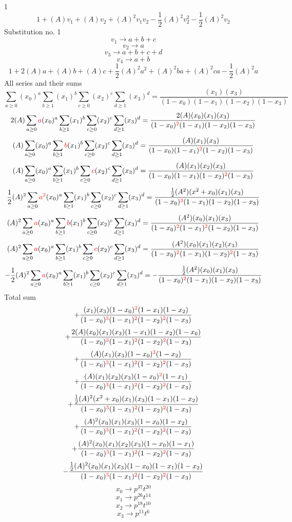 \documentclass{article}
\begin{document}
                
1
\[1+(A)v_1+(A)v_2+(A)^2v_1v_2-\frac{1}{2}(A)^2v_2^{2}-\frac{1}{2}(A)^2v_2\]Substitution no. 1\[v_1\rightarrow{a+b+c}\]\[v_2\rightarrow{a}\]\[v_3\rightarrow{a+b+c+d}\]\[v_4\rightarrow{a+b}\]\[1+2(A)a+(A)b+(A)c+\frac{1}{2}(A)^2a^{2}+(A)^2ba+(A)^2ca-\frac{1}{2}(A)^2a\]All series and their sums\[\sum_{a\geq{0}}(x_0)^{a}\sum_{b\geq{1}}(x_1)^{b}\sum_{c\geq{0}}(x_2)^{c}\sum_{d\geq{1}}(x_3)^{d}=\frac{(x_1)(x_3)}{(1-x_0)(1-x_1)(1-x_2)(1-x_3)}\]\[2(A)\sum_{a\geq{0}}\textcolor{red}{a}(x_0)^{a}\sum_{b\geq{1}}(x_1)^{b}\sum_{c\geq{0}}(x_2)^{c}\sum_{d\geq{1}}(x_3)^{d}=\frac{2(A)(x_0)(x_1)(x_3)}{(1-x_0)^{\textcolor{red}{2}}(1-x_1)(1-x_2)(1-x_3)}\]\[(A)\sum_{a\geq{0}}(x_0)^{a}\sum_{b\geq{1}}\textcolor{red}{b}(x_1)^{b}\sum_{c\geq{0}}(x_2)^{c}\sum_{d\geq{1}}(x_3)^{d}=\frac{(A)(x_1)(x_3)}{(1-x_0)(1-x_1)^{\textcolor{red}{2}}(1-x_2)(1-x_3)}\]\[(A)\sum_{a\geq{0}}(x_0)^{a}\sum_{b\geq{1}}(x_1)^{b}\sum_{c\geq{0}}\textcolor{red}{c}(x_2)^{c}\sum_{d\geq{1}}(x_3)^{d}=\frac{(A)(x_1)(x_2)(x_3)}{(1-x_0)(1-x_1)(1-x_2)^{\textcolor{red}{2}}(1-x_3)}\]\[\frac{1}{2}(A)^{2}\sum_{a\geq{0}}\textcolor{red}{a^{2}}(x_0)^{a}\sum_{b\geq{1}}(x_1)^{b}\sum_{c\geq{0}}(x_2)^{c}\sum_{d\geq{1}}(x_3)^{d}=\frac{\frac{1}{2}(A^{2})(x^{2}+x_0)(x_1)(x_3)}{(1-x_0)^{\textcolor{red}{3}}(1-x_1)(1-x_2)(1-x_3)}\]\[(A)^{2}\sum_{a\geq{0}}\textcolor{red}{a}(x_0)^{a}\sum_{b\geq{1}}\textcolor{red}{b}(x_1)^{b}\sum_{c\geq{0}}(x_2)^{c}\sum_{d\geq{1}}(x_3)^{d}=\frac{(A^{2})(x_0)(x_1)(x_3)}{(1-x_0)^{\textcolor{red}{2}}(1-x_1)^{\textcolor{red}{2}}(1-x_2)(1-x_3)}\]\[(A)^{2}\sum_{a\geq{0}}\textcolor{red}{a}(x_0)^{a}\sum_{b\geq{1}}(x_1)^{b}\sum_{c\geq{0}}\textcolor{red}{c}(x_2)^{c}\sum_{d\geq{1}}(x_3)^{d}=\frac{(A^{2})(x_0)(x_1)(x_2)(x_3)}{(1-x_0)^{\textcolor{red}{2}}(1-x_1)(1-x_2)^{\textcolor{red}{2}}(1-x_3)}\]\[-\frac{1}{2}(A)^{2}\sum_{a\geq{0}}\textcolor{red}{a}(x_0)^{a}\sum_{b\geq{1}}(x_1)^{b}\sum_{c\geq{0}}(x_2)^{c}\sum_{d\geq{1}}(x_3)^{d}=-\frac{\frac{1}{2}(A^{2})(x_0)(x_1)(x_3)}{(1-x_0)^{\textcolor{red}{2}}(1-x_1)(1-x_2)(1-x_3)}\]
Total sum
\[+\frac{(x_1)(x_3)(1-x_0)^{\textcolor{red}{2}}(1-x_1)(1-x_2)}{(1-x_0)^{\textcolor{red}{3}}(1-x_1)^{\textcolor{red}{2}}(1-x_2)^{\textcolor{red}{2}}(1-x_3)}\]\[+\frac{2(A)(x_0)(x_1)(x_3)(1-x_1)(1-x_2)(1-x_0)}{(1-x_0)^{\textcolor{red}{3}}(1-x_1)^{\textcolor{red}{2}}(1-x_2)^{\textcolor{red}{2}}(1-x_3)}\]\[+\frac{(A)(x_1)(x_3)(1-x_0)^{\textcolor{red}{2}}(1-x_2)}{(1-x_0)^{\textcolor{red}{3}}(1-x_1)^{\textcolor{red}{2}}(1-x_2)^{\textcolor{red}{2}}(1-x_3)}\]\[+\frac{(A)(x_1)(x_2)(x_3)(1-x_0)^{\textcolor{red}{2}}(1-x_1)}{(1-x_0)^{\textcolor{red}{3}}(1-x_1)^{\textcolor{red}{2}}(1-x_2)^{\textcolor{red}{2}}(1-x_3)}\]\[+\frac{\frac{1}{2}(A)^{2}(x^{2}+x_0)(x_1)(x_3)(1-x_1)(1-x_2)}{(1-x_0)^{\textcolor{red}{3}}(1-x_1)^{\textcolor{red}{2}}(1-x_2)^{\textcolor{red}{2}}(1-x_3)}\]\[+\frac{(A)^{2}(x_0)(x_1)(x_3)(1-x_0)(1-x_2)}{(1-x_0)^{\textcolor{red}{3}}(1-x_1)^{\textcolor{red}{2}}(1-x_2)^{\textcolor{red}{2}}(1-x_3)}\]\[+\frac{(A)^{2}(x_0)(x_1)(x_2)(x_3)(1-x_0)(1-x_1)}{(1-x_0)^{\textcolor{red}{3}}(1-x_1)^{\textcolor{red}{2}}(1-x_2)^{\textcolor{red}{2}}(1-x_3)}\]\[-\frac{\frac{1}{2}(A)^{2}(x_0)(x_1)(x_3)(1-x_0)(1-x_1)(1-x_2)}{(1-x_0)^{\textcolor{red}{3}}(1-x_1)^{\textcolor{red}{2}}(1-x_2)^{\textcolor{red}{2}}(1-x_3)}\]\[x_0\rightarrow{p^{37}t^{20}}\]\[x_1\rightarrow{p^{26}t^{14}}\]\[x_2\rightarrow{p^{18}t^{10}}\]\[x_3\rightarrow{p^{11}t^{6}}\]
\end{document}
